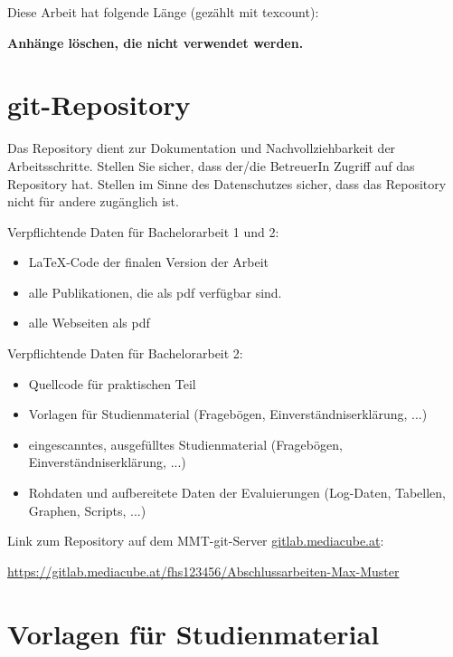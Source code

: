 \begin{appendices}

\ifmmtreviewversion
Diese Arbeit hat folgende Länge (gezählt mit texcount): 
\fi 


\textbf{\color{red} Anhänge löschen, die nicht verwendet werden.}


\section{git-Repository}

Das Repository dient zur Dokumentation und Nachvollziehbarkeit der Arbeitsschritte. Stellen Sie sicher, dass der/die BetreuerIn Zugriff auf das Repository hat. Stellen im Sinne des Datenschutzes sicher, dass das Repository nicht für andere zugänglich ist.

Verpflichtende Daten für Bachelorarbeit 1 und 2:

\begin{itemize}
	\item LaTeX-Code der finalen Version der Arbeit
	\item alle Publikationen, die als pdf verfügbar sind.
	\item alle Webseiten als pdf
\end{itemize}

Verpflichtende Daten für Bachelorarbeit 2:
\begin{itemize}
	\item Quellcode für praktischen Teil
	\item Vorlagen für Studienmaterial (Fragebögen, Einverständniserklärung, ...)	
	\item eingescanntes, ausgefülltes Studienmaterial (Fragebögen, Einverständniserklärung, ...)
	\item Rohdaten und aufbereitete Daten der Evaluierungen (Log-Daten, Tabellen, Graphen, Scripts, ...)	
\end{itemize}

Link zum Repository auf dem MMT-git-Server {\url{gitlab.mediacube.at}}:

{\color{red}\url{https://gitlab.mediacube.at/fhs123456/Abschlussarbeiten-Max-Muster}}
	
\section{Vorlagen für Studienmaterial}


\end{appendices}
